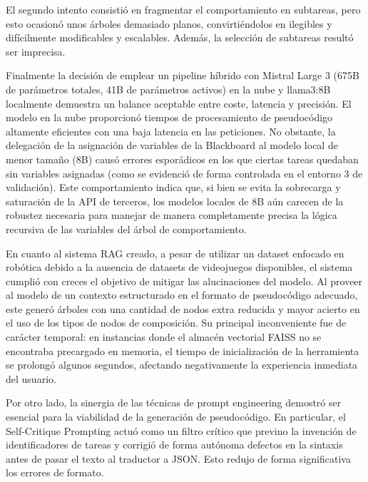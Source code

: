 El segundo intento consistió en fragmentar el comportamiento en subtareas, pero esto ocasionó unos árboles demasiado planos, convirtiéndolos en ilegibles y difícilmente modificables y escalables.
Además, la selección de subtareas resultó ser imprecisa. 

Finalmente la decisión de emplear un pipeline híbrido con Mistral Large 3 (675B de parámetros totales, 41B de parámetros activos) en la nube y llama3:8B localmente demuestra un balance aceptable entre coste, latencia y precisión.
El modelo en la nube proporcionó tiempos de procesamiento de pseudocódigo altamente eficientes con una baja latencia en las peticiones.
No obstante, la delegación de la asignación de variables de la Blackboard al modelo local de menor tamaño (8B) causó errores esporádicos en los que ciertas tareas quedaban sin variables asignadas (como se evidenció de forma controlada en el entorno 3 de validación).
Este comportamiento indica que, si bien se evita la sobrecarga y saturación de la API de terceros, los modelos locales de 8B aún carecen de la robustez necesaria para manejar de manera completamente precisa la lógica recursiva de las variables del árbol de comportamiento.

En cuanto al sistema RAG creado, a pesar de utilizar un dataset enfocado en robótica debido a la ausencia de datasets de videojuegos disponibles, el sistema cumplió con creces el objetivo de mitigar las alucinaciones del modelo.
Al proveer al modelo de un contexto estructurado en el formato de pseudocódigo adecuado, este generó árboles con una cantidad de nodos extra reducida y mayor acierto en el uso de los tipos de nodos de composición.
Su principal inconveniente fue de carácter temporal: en instancias donde el almacén vectorial FAISS no se encontraba precargado en memoria, el tiempo de inicialización de la herramienta se prolongó algunos segundos, afectando negativamente la experiencia inmediata del usuario.

Por otro lado, la sinergia de las técnicas de prompt engineering demostró ser esencial para la viabilidad de la generación de pseudocódigo.
En particular, el Self-Critique Prompting actuó como un filtro crítico que previno la invención de identificadores de tareas y corrigió de forma autónoma defectos en la sintaxis antes de pasar el texto al traductor a JSON.
Esto redujo de forma significativa los errores de formato.

